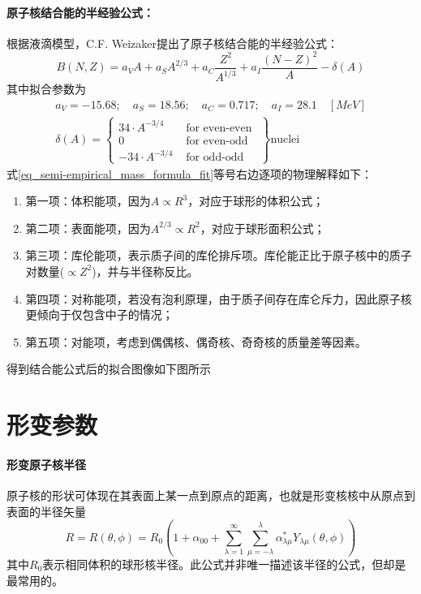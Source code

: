 \paragraph*{原子核结合能的半经验公式：}根据液滴模型，C.F. Weizaker提出了原子核结合能的半经验公式：
\begin{equation}
	B(N, Z) = a_V A + a_S A^{2/3} + a_C \frac{Z^2}{A^{1/3}} + a_I \frac{(N-Z)^2}{A} - \delta(A)	\label{eq_semi-empirical_mass_formula}
\end{equation} 
其中拟合参数为
\begin{equation}
    \begin{aligned}
		a_V = -15.68; \quad a_S = 18.56; \quad a_C = 0.717; \quad a_I = 28.1	\quad	[MeV]	\\
		\delta(A) = \left\{ \begin{array}{cc}
				34 \cdot A^{-3/4} & \text{ for even-even } \\
				0 & \text{ for even-odd }	\\
				-34 \cdot A^{-3/4} & \text{ for odd-odd }
		\end{array}\right\} \text{nuclei}
    \end{aligned}
    	\label{eq_semi-empirical_mass_formula_fit}
\end{equation} 
式\eqref{eq_semi-empirical_mass_formula_fit}等号右边逐项的物理解释如下：
\begin{enumerate}
	\item 第一项：体积能项，因为$ A \propto R^3$，对应于球形的体积公式；
	\item 第二项：表面能项，因为$ A^{2/3} \propto R^2$，对应于球形面积公式；
	\item 第三项：库伦能项，表示质子间的库伦排斥项。库伦能正比于原子核中的质子对数量($\propto Z^2$)，并与半径称反比。
	\item 第四项：对称能项，若没有泡利原理，由于质子间存在库仑斥力，因此原子核更倾向于仅包含中子的情况；
	\item 第五项：对能项，考虑到偶偶核、偶奇核、奇奇核的质量差等因素。
\end{enumerate}
得到结合能公式后的拟合图像如下图所示


\section{形变参数}
\paragraph*{形变原子核半径}
原子核的形状可体现在其表面上某一点到原点的距离，也就是形变核核中从原点到表面的半径矢量
\begin{equation}
	R = R(\theta, \phi) = R_0 ( 1 + \alpha_{00} + \sum_{\lambda = 1}^{\infty} \sum_{\mu = -\lambda}^{\lambda}\alpha^{*}_{\lambda\mu} Y_{\lambda\mu}(\theta, \phi) )	\label{eq:nul-radii}
\end{equation} 
其中$R_0$表示相同体积的球形核半径。此公式并非唯一描述该半径的公式，但却是最常用的。

